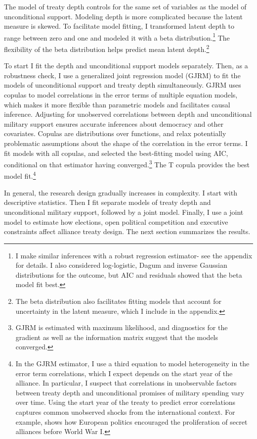 \documentclass[12pt]{article}
\begin{document}
The model of treaty depth controls for the same set of variables as the model of unconditional support.  
Modeling depth is more complicated because the latent measure is skewed.
To facilitate model fitting, I transformed latent depth to range between zero and one and modeled it with a beta distribution.\footnote{I make similar inferences with a robust regression estimator- see the appendix for details. I also considered log-logistic, Dagum and inverse Gaussian distributions for the outcome, but AIC and residuals showed that the beta model fit best.}
The flexibility of the beta distribution helps predict mean latent depth.\footnote{The beta distribution also facilitates fitting models that account for uncertainty in the latent measure, which I include in the appendix.} 


To start I fit the depth and unconditional support models separately.
Then, as a robustness check, I use a generalized joint regression model (GJRM) \citep{Braumoelleretal2018} to fit the models of unconditional support and treaty depth simultaneously.
GJRM uses copulas to model correlations in the error terms of multiple equation models, which makes it more flexible than parametric models and facilitates causal inference. 
Adjusting for unobserved correlations between depth and unconditional military support ensures accurate inferences about democracy and other covariates. 
Copulas are distributions over functions, and relax potentially problematic assumptions about the shape of the correlation in the error terms. 
I fit models with all copulas, and selected the best-fitting model using AIC, conditional on that estimator having converged.\footnote{GJRM is estimated with maximum likelihood, and diagnostics for the gradient as well as the information matrix suggest that the models converged.} 
The T copula provides the best model fit.\footnote{In the GJRM estimator, I use a third equation to model heterogeneity in the error term correlations, which I expect depends on the start year of the alliance. 
In particular, I suspect that correlations in unobservable factors between treaty depth and unconditional promises of military spending vary over time. 
Using the start year of the treaty to predict error correlations captures common unobserved shocks from the international context. 
For example, \citet{Kuo2019} shows how European politics encouraged the proliferation of secret alliances before World War I.}


In general, the research design gradually increases in complexity. 
I start with descriptive statistics. 
Then I fit separate models of treaty depth and unconditional military support, followed by a joint model. 
Finally, I use a joint model to estimate how elections, open political competition and executive constraints affect alliance treaty design. 
The next section summarizes the results. 
\end{document}
